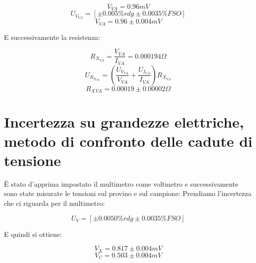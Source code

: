 \documentclass[a4paper]{article}
\begin{document}
\begin{Large}
	\begin{equation}
		V_{VA}= 0.96 mV
	\end{equation}
	\begin{equation}
		U_{V_{VA}} = [\pm 0.005\%rdg \pm 0.0035\% FSO]
	 \end{equation}
	 \begin{equation}
		V_{VA} = 0.96 \pm 0.004 mV
	 \end{equation}
\end{Large}
E successivamente la resistenza:
\begin{Large}
	\begin{equation}
		R_{X_{VA}}= \frac{V_{VA}}{I_{VA}} =0.000194 \Omega
	\end{equation}
	\begin{equation}
		U_{R_{X_{VA}}} = (\frac{U_{V_{VA}}}{V_{VA}}+\frac{U_{I_{VA}}}{I_{VA}})R_{X_{VA}}
	 \end{equation}
	 \begin{equation}
		R_X{_{VA}} = 0.00019\pm 0.00002\Omega
	 \end{equation}
\end{Large}

\section {Incertezza su grandezze elettriche, metodo di confronto delle cadute di tensione}
È stato d'apprima impostato il multimetro come voltmetro e successivamente sono state misurate le tensioni sul provino e sul campione:
Prendiamo l'incertezza che ci riguarda per il multimetro:

\begin{Large} 
	\begin{equation}
		U_{V} = [\pm 0.0050\%rdg \pm 0.0035\% FSO]
	 \end{equation}
\end{Large}
E quindi si ottiene:
\begin{Large} 
	\begin{equation}
		V_X = 0.817 \pm 0.004 mV
	 \end{equation}
	 \begin{equation}
		V_C = 0.503 \pm 0.004 mV
	 \end{equation}
\end{Large}
\end{document}
